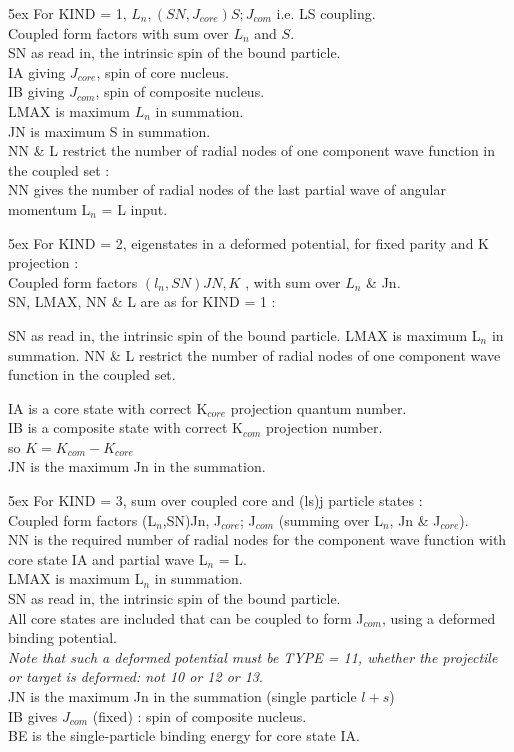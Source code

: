 \documentclass[11pt]{article}
\begin{document}
\hangindent 5ex
For KIND = 1,   $L_{n},(SN,J_{core})S; J_{com}$     i.e. LS coupling.
\\
Coupled form factors with sum over $L_{n}$ and $S$.
\\
SN as read in, the intrinsic spin of the bound particle.
\\
IA giving $J_{core}$, spin of core nucleus.
\\
IB giving $J_{com}$,  spin of composite nucleus.
\\
LMAX is maximum $L_{n}$ in summation.
\\
JN   is maximum S  in summation.
\\
NN \& L restrict the number of radial nodes of one component
wave function in the coupled set :
\\
NN gives the number of radial nodes of the last partial wave of
angular momentum L$_{n}$ = L input.
\bigskip

\hangindent 5ex
For KIND = 2,   eigenstates in a deformed potential, for fixed
parity and K projection :
\\
Coupled form factors  $(l_{n},SN) JN,K$ , with sum over $L_{n}$ \& Jn.
\\
SN, LMAX, NN \& L are as for KIND = 1 :

 SN as read in, the intrinsic spin of the bound particle.
 LMAX is maximum L$_{n}$ in summation.
 NN \& L restrict the number of radial nodes of one component
wave function in the coupled set.

IA is a core state with correct K$_{core}$ projection quantum number.
\\
IB is a composite state with correct K$_{com}$ projection number.
\\
    so $K = K_{com} - K_{core}$
\\
JN is the maximum Jn in the summation.
\bigskip

\hangindent 5ex
For KIND = 3,   sum over coupled core and (ls)j particle states :
\\
Coupled form factors (L$_n$,SN)Jn,  J$_{core}$; J$_{com}$
        (summing over L$_n$,   Jn \& J$_{core}$).
\\
NN is the required number of radial nodes for the component
wave function with core state IA and partial wave L$_n$ = L.
\\
LMAX is maximum L$_n$ in summation.
\\
SN as read in, the intrinsic spin of the bound particle.
\\
All core states are included that can be coupled to form J$_{com}$,
using a deformed binding potential.
\\
{\em Note that such a deformed potential must be TYPE = 11,
whether the projectile or target is deformed: not 10 or 12 or 13}.
\\
JN is the maximum Jn in the summation (single particle $l+s$)
\\
IB gives $J_{com}$ (fixed) : spin of composite nucleus.
\\
BE is the single-particle binding energy for core state IA.
\end{document}
